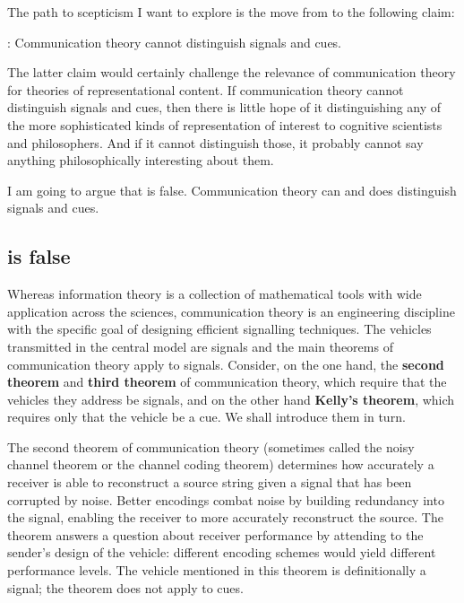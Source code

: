 \documentclass[12pt]{article}
\begin{document}
\noindent The path to scepticism I want to explore is the move from \ami{} to the following claim:

\begin{myquote}
\act: Communication theory cannot distinguish signals and cues.
\end{myquote}

\noindent The latter claim would certainly challenge the relevance of communication theory for theories of representational content.
If communication theory cannot distinguish signals and cues, then there is little hope of it distinguishing any of the more sophisticated kinds of representation of interest to cognitive scientists and philosophers.
And if it cannot distinguish those, it probably cannot say anything philosophically interesting about them.

I am going to argue that \act{} is false.
Communication theory can and does distinguish signals and cues.


\subsection{\act{} is false}\label{subsec:actFalse}

Whereas information theory is a collection of mathematical tools with wide application across the sciences, communication theory is an engineering discipline with the specific goal of designing efficient signalling techniques.
The vehicles transmitted in the central model are signals and the main theorems of communication theory apply to signals.
Consider, on the one hand, the \textbf{second theorem} and \textbf{third theorem} of communication theory, which require that the vehicles they address be signals, and on the other hand \textbf{Kelly's theorem}, which requires only that the vehicle be a cue.
We shall introduce them in turn.

The second theorem of communication theory (sometimes called the noisy channel theorem or the channel coding theorem) determines how accurately a receiver is able to reconstruct a source string given a signal that has been corrupted by noise.
Better encodings combat noise by building redundancy into the signal, enabling the receiver to more accurately reconstruct the source.
The theorem answers a question about receiver performance by attending to the sender's design of the vehicle: different encoding schemes would yield different performance levels.
The vehicle mentioned in this theorem is definitionally a signal; the theorem does not apply to cues.
\end{document}
